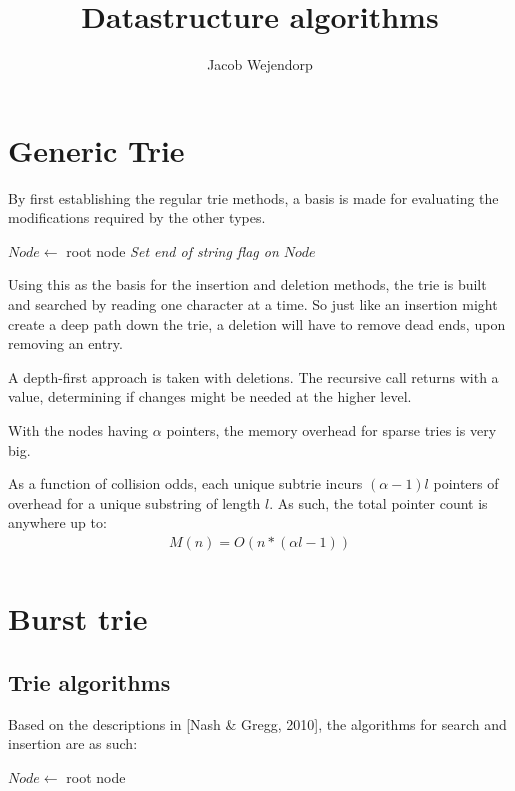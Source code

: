 \documentclass[11pt,a4paper]{article}
\title{Datastructure algorithms}
\author{Jacob Wejendorp}
\begin{document}
\maketitle

\section{Generic Trie}
By first establishing the regular trie methods, a basis is made for evaluating
the modifications required by the other types.

\begin{algorithm}[H]
    \caption{$k$\FuncSty{)}}
    $Node \leftarrow$  root node\;
    \emph{Set end of string flag on $Node$}\;
\end{algorithm}
Using this as the basis for the insertion and deletion methods, the trie is
built and searched by reading one character at a time. So just like an
insertion might create a deep path down the trie, a deletion will have to
remove dead ends, upon removing an entry.

A depth-first approach is taken with deletions. The recursive call returns with
a value, determining if changes might be needed at the higher level.

With the nodes having $\alpha$ pointers, the memory overhead for sparse tries
is very big.

As a function of collision odds, each unique subtrie incurs $(\alpha-1) l$
pointers of overhead for a unique substring of length $l$. As such, the total
pointer count is anywhere up to:
\begin{align*}
    M(n) = O(n * (\alpha l - 1))\\
\end{align*}


\newpage
\section{Burst trie}
\subsection{Trie algorithms}
Based on the descriptions in [Nash \& Gregg, 2010], the algorithms for search
and insertion are as such:

\begin{algorithm}[H]
    \caption{$k$\FuncSty{)}}
    $Node \leftarrow$  root node\;
\end{algorithm}
\end{document}
